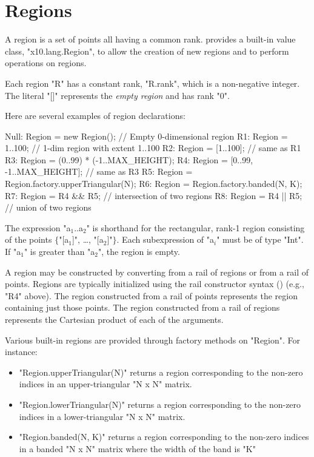 \section{Regions}\label{XtenRegions}

A region is a set of points all having a common rank.  {}\Xten{}
provides a built-in value class, \xcd"x10.lang.Region", to allow the
creation of new regions and to perform operations on regions.

Each region \xcd"R" has a constant rank, \xcd"R.rank", which is a
non-negative integer. The literal \xcd"[]" represents the {\em empty
region} and has rank \xcd"0".

Here are several examples of region declarations:
\begin{xten}
Null: Region = new Region();  // Empty 0-dimensional region          
R1: Region = 1..100; // 1-dim region with extent 1..100
R2: Region = [1..100]; // same as R1
R3: Region = (0..99) * (-1..MAX_HEIGHT);   
R4: Region = [0..99, -1..MAX_HEIGHT]; // same as R3  
R5: Region = Region.factory.upperTriangular(N);
R6: Region = Region.factory.banded(N, K);
R7: Region = R4 && R5; // intersection of two regions
R8: Region = R4 || R5; // union of two regions
\end{xten}

The expression \xcdmath"a$_1$..a$_2$"
is shorthand for the rectangular, rank-1 region
consisting of the points
$\{$\xcdmath"[a$_1$]", \dots, \xcdmath"[a$_2$]"$\}$.
Each subexpression of \xcdmath"a$_i$" must be of type \xcd"Int".
If \xcdmath"a$_1$"
is greater than \xcdmath"a$_2$", the region is empty.

A region may be constructed by converting from a rail of
regions or from a rail of points.  Regions are typically 
initialized using the rail constructor syntax
()
(e.g., \xcd"R4" above).
The region constructed from a rail of points represents the
region containing just those points.
The region constructed from a rail of regions
represents
the Cartesian product of each of the arguments.


Various built-in regions are provided through  factory
methods on \xcd"Region".  For instance:
\begin{itemize}
\item \xcd"Region.upperTriangular(N)" returns a region corresponding
to the non-zero indices in an upper-triangular \xcd"N x N" matrix.
\item \xcd"Region.lowerTriangular(N)" returns a region corresponding
to the non-zero indices in a lower-triangular \xcd"N x N" matrix.
\item \xcd"Region.banded(N, K)" returns a region corresponding to
the non-zero indices in a banded \xcd"N x N" matrix where the width of
the band is \xcd"K"
\end{itemize}

